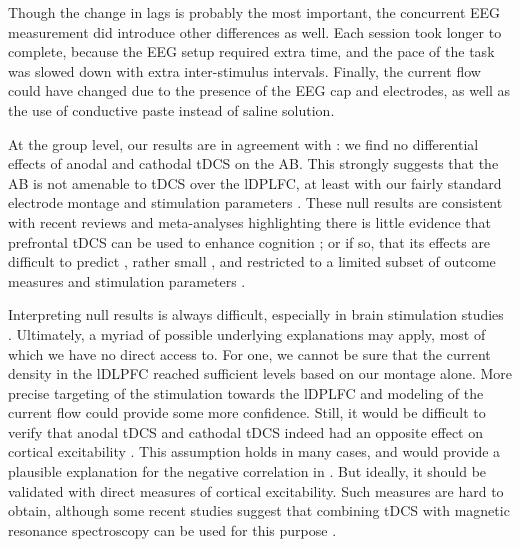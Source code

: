 \documentclass[11pt,]{memoir}
\begin{document}
Though the change in lags is probably the most important, the concurrent EEG measurement did introduce other differences as well. Each session took longer to complete, because the EEG setup required extra time, and the pace of the task was slowed down with extra inter-stimulus intervals. Finally, the current flow could have changed due to the presence of the EEG cap and electrodes, as well as the use of conductive paste instead of saline solution.

At the group level, our results are in agreement with \textcite{London2015}: we find no differential effects of anodal and cathodal tDCS on the AB. This strongly suggests that the AB is not amenable to tDCS over the lDPLFC, at least with our fairly standard electrode montage and stimulation parameters \autocite{Santarnecchi2015}. These null results are consistent with recent reviews and meta-analyses highlighting there is little evidence that prefrontal tDCS can be used to enhance cognition \autocite{Medina2017}; or if so, that its effects are difficult to predict \autocite{Tremblay2014a}, rather small \autocite{Dedoncker2016a}, and restricted to a limited subset of outcome measures and stimulation parameters \autocite{Imburgio2018}.

Interpreting null results is always difficult, especially in brain stimulation studies \autocite{DeGraaf2018}. Ultimately, a myriad of possible underlying explanations may apply, most of which we have no direct access to. For one, we cannot be sure that the current density in the lDLPFC reached sufficient levels \autocites{Kim2014}{Opitz2015} based on our montage alone. More precise targeting of the stimulation towards the lDPLFC \autocite{Datta2009} and modeling of the current flow \autocites{DeBerker2013}{Karabanov2019} could provide some more confidence. Still, it would be difficult to verify that anodal tDCS and cathodal tDCS indeed had an opposite effect on cortical excitability \autocites{Bestmann2014}{Bestmann2017}. This assumption holds in many cases, and would provide a plausible explanation for the negative correlation in \textcites{London2015}{Krause2014}. But ideally, it should be validated with direct measures of cortical excitability. Such measures are hard to obtain, although some recent studies suggest that combining tDCS with magnetic resonance spectroscopy can be used for this purpose \autocites{Filmer2019}{Antonenko2019}{Talsma2018}.
\end{document}
